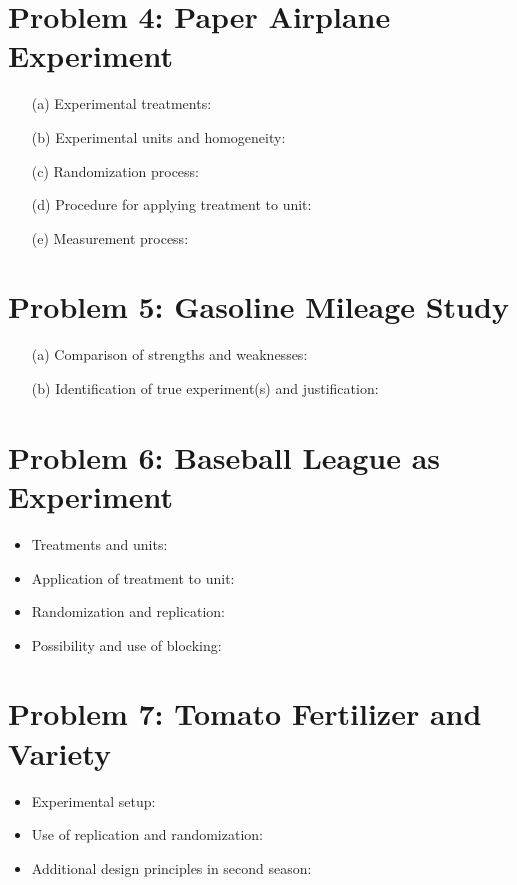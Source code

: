 \documentclass[10pt, oneside]{article}
\begin{document}
\section*{Problem 4: Paper Airplane Experiment}
\begin{itemize}
	\item[(a)] Experimental treatments:
	\item[(b)] Experimental units and homogeneity:
	\item[(c)] Randomization process:
	\item[(d)] Procedure for applying treatment to unit:
	\item[(e)] Measurement process:
\end{itemize}

\section*{Problem 5: Gasoline Mileage Study}
\begin{itemize}
	\item[(a)] Comparison of strengths and weaknesses:
	\item[(b)] Identification of true experiment(s) and justification:
\end{itemize}

\section*{Problem 6: Baseball League as Experiment}
\begin{itemize}
	\item Treatments and units:
	\item Application of treatment to unit:
	\item Randomization and replication:
	\item Possibility and use of blocking:
\end{itemize}

\section*{Problem 7: Tomato Fertilizer and Variety}
\begin{itemize}
	\item Experimental setup:
	\item Use of replication and randomization:
	\item Additional design principles in second season:
\end{itemize}
\end{document}
